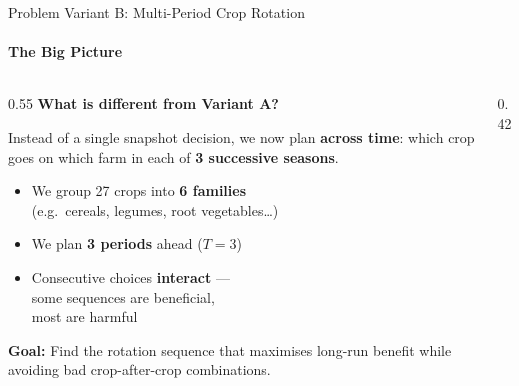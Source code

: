 \begin{frame}{Problem Variant B: Multi-Period Crop Rotation}
    \framesubtitle{The Big Picture}

    \begin{columns}[T]
        \begin{column}{0.55\textwidth}
            \textbf{What is different from Variant A?}
            \vspace{0.3cm}

            Instead of a single snapshot decision, we now plan
            \textbf{across time}: which crop goes on which farm
            in each of \textbf{3 successive seasons}.

            \vspace{0.3cm}
            \begin{itemize}
                \item We group 27 crops into \textbf{6 families}\\
                      {\small (e.g.\ cereals, legumes, root vegetables\ldots)}
                \item We plan \textbf{3 periods} ahead ($T = 3$)
                \item Consecutive choices \textbf{interact} —\\
                      some sequences are beneficial,\\
                      most are harmful
            \end{itemize}

            \vspace{0.3cm}
            \textbf{Goal:} Find the rotation sequence that
            maximises long-run benefit while avoiding
            bad crop-after-crop combinations.
        \end{column}
        \begin{column}{0.42\textwidth}
        \end{column}
    \end{columns}
\end{frame}

